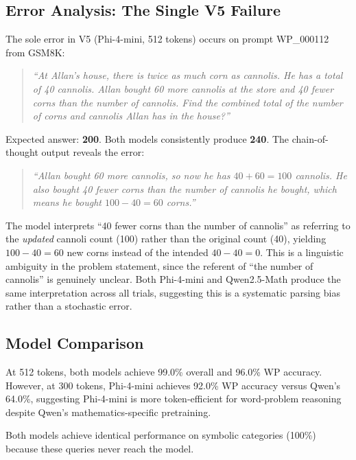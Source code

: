\documentclass[journal]{IEEEtai}
\begin{document}
\subsection{Error Analysis: The Single V5 Failure}
\label{sec:error_analysis}

The sole error in V5 (Phi-4-mini, 512 tokens) occurs on prompt WP\_000112 from GSM8K:

\begin{quote}
\small
\textit{``At Allan's house, there is twice as much corn as cannolis. He has a total of 40 cannolis. Allan bought 60 more cannolis at the store and 40 fewer corns than the number of cannolis. Find the combined total of the number of corns and cannolis Allan has in the house?''}
\end{quote}

Expected answer: \textbf{200}. Both models consistently produce \textbf{240}. The chain-of-thought output reveals the error:

\begin{quote}
\small
\textit{``Allan bought 60 more cannolis, so now he has $40 + 60 = 100$ cannolis. He also bought 40 fewer corns than the number of cannolis he bought, which means he bought $100 - 40 = 60$ corns.''}
\end{quote}

The model interprets ``40 fewer corns than the number of cannolis'' as referring to the \textit{updated} cannoli count (100) rather than the original count (40), yielding $100 - 40 = 60$ new corns instead of the intended $40 - 40 = 0$. This is a linguistic ambiguity in the problem statement, since the referent of ``the number of cannolis'' is genuinely unclear. Both Phi-4-mini and Qwen2.5-Math produce the same interpretation across all trials, suggesting this is a systematic parsing bias rather than a stochastic error.

\subsection{Model Comparison}

At 512 tokens, both models achieve 99.0\% overall and 96.0\% WP accuracy. However, at 300 tokens, Phi-4-mini achieves 92.0\% WP accuracy versus Qwen's 64.0\%, suggesting Phi-4-mini is more token-efficient for word-problem reasoning despite Qwen's mathematics-specific pretraining.

Both models achieve identical performance on symbolic categories (100\%) because these queries never reach the model.
\end{document}
